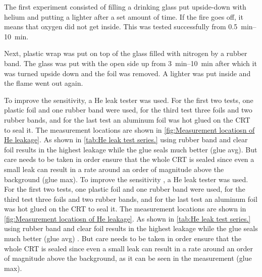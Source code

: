 The first experiment consisted of filling a drinking glass put upside-down with helium and putting a lighter after a set amount of time. If the fire goes off, it means that oxygen did not get inside. This was tested successfully from \SIrange{0.5}{10}{\minute}.

Next, plastic wrap was put on top of the glass filled with nitrogen by a rubber band. The glass was put with the open side up from \SIrange{3}{10}{\minute} after which it was turned upside down and the foil was removed. A lighter was put inside and the flame went out again.

To improve the sensitivity, a He leak tester was used. For the first two tests, one plastic foil and one rubber band were used, for the third test three foils and two rubber bands, and for the last test an aluminum foil was hot glued on the CRT to seal it. The measurement locations are shown in \cref{fig:Measurement locatiosn of He leakage}. As shown in \cref{tab:He leak test series.} using rubber band and clear foil results in the highest leakage while the glue seals much better (glue avg). But care needs to be taken in order ensure that the whole CRT is sealed since even a small leak can result in a rate around an order of magnitude above the background (glue max).
To improve the sensitivity , a He leak tester was used. For the first two tests, one plastic foil and one rubber band were used, for the third test three foils and two rubber bands, and for the last test an aluminum foil was hot glued on the CRT to seal it. The measurement locations are shown in \cref{fig:Measurement locatiosn of He leakage}. As shown in \cref{tab:He leak test series.} using rubber band and clear foil results in the highest leakage while the glue seals much better (glue avg) . But care needs to be taken in order ensure that the whole CRT is sealed since even a small leak can result in a rate around an order of magnitude above the background, as it can be seen in the measurement (glue max).

